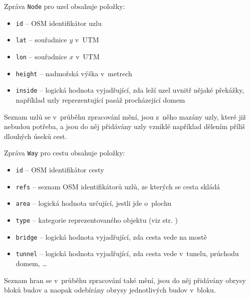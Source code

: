 Zpráva \verb|Node| pro uzel obsahuje položky:
\begin{itemize}
	\item \verb|id| -- OSM identifikátor uzlu
	\item \verb|lat| -- souřadnice $y$ v~UTM
	\item \verb|lon| -- souřadnice $x$ v~UTM
	\item \verb|height| -- nadmořská výška v~metrech
	\item \verb|inside| -- logická hodnota vyjadřující, zda leží uzel uvnitř
	nějaké překážky, například uzly reprezentující pasáž procházející domem
\end{itemize}
Seznam uzlů se v~průběhu zpracování mění, jsou z~něho mazány uzly, které již
nebudou potřeba, a jsou do něj přidávány uzly vzniklé například dělením příliš
dlouhých úseků cest.

Zpráva \verb|Way| pro cestu obsahuje položky:
\begin{itemize}
	\item \verb|id| -- OSM identifikátor cesty
	\item \verb|refs| -- seznam OSM identifikátorů uzlů, ze kterých se cesta
	skládá
	\item \verb|area| -- logická hodnota určující, jestli jde o~plochu
	\item \verb|type| -- kategorie reprezentovaného objektu (viz str. 
	\pageref{label:kategorie})
	\item \verb|bridge| -- logická hodnota vyjadřující, zda cesta vede na mostě
	\item \verb|tunnel| -- logická hodnota vyjadřující, zda cesta vede
v~tunelu, průchodu domem, \dots
\end{itemize}
Seznam hran se v~průběhu zpracování také mění, jsou do něj přidávány obrysy
bloků budov a naopak odebírány obrysy jednotlivých budov v~bloku.

